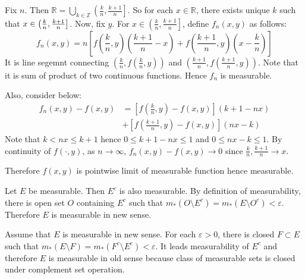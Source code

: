 \begin{problem}[1.23] \hfill

	Fix $n$. Then $\mathbb{R} = \bigcup_{k \in \mathbb{Z}} \left ( \frac{k}{n}, \frac{k+1}{n} \right ]$. So for each $x \in \mathbb{R}$, there exists unique $k$ such that $x \in \left ( {k \over n}, \frac{k+1}{n} \right ]$. Now, fix $y$. For $x \in \left ( \frac{k}{n}, \frac{k+1}{n} \right ]$, define $f_n(x, y)$ as follows:
	\begin{equation*}
		f_n(x, y) = n \left[ f\left( \frac{k}{n}, y \right)\left( \frac{k+1}{n}-x \right) + f\left( \frac{k+1}{n}, y \right)\left( x-\frac{k}{n} \right) \right]
		\label{<+label+>}
	\end{equation*}
	It is line segemnt connecting $\left( \frac{k}{n}, f\left( \frac{k}{n}, y \right) \right)$ and $\left( \frac{k+1}{n}, f\left( \frac{k+1}{n}, y \right) \right)$.
	Note that it is sum of product of two continuous functions. Hence $f_n$ is measurable. 

	Also, consider below:
	\begin{equation*}
		\begin{split}
			f_n(x, y) - f(x, y)
			& = \left[ f\left( \frac{k}{n}, y \right) - f(x, y) \right]\left( k+1 -nx \right) \\
			& + \left[ f\left( \frac{k+1}{n}, y \right) - f(x, y) \right]\left( nx -k \right)
		\end{split}
		\label{<+label+>}
	\end{equation*}
	Note that $k < nx \leq k+1$ hence $0\leq k+1 -nx \leq 1$ and $0 \leq nx -k \leq 1$. 
	By continuity of $f(\cdot, y)$, as $n \rightarrow \infty$, $f_n(x, y) - f(x, y) \rightarrow 0$ since $\frac{k}{n}, \frac{k+1}{n} \rightarrow x$. 

	Therefore $f(x, y)$ is pointwise limit of measurable function hence measurable.
\end{problem}

\begin{problem}[1.25] \hfill

	Let $E$ be measurable. Then $E^c$ is also measurable. By definition of measurability, there is open set $O$ containing $E^c$ such that $m_*(O \setminus E^c) = m_* (E \setminus O^c) < \varepsilon$. Therefore $E$ is measurable in new sense.

	Assume that $E$ is measurable in new sense. For each $\varepsilon>0$, there is closed $F \subset E$ such that $m_*(E \setminus F) = m_*(F^c \setminus E^c) < \varepsilon$. It leads measurability of $E^c$ and therefore $E$ is measurable in old sense because class of measurable sets is closed under complement set operation.
	
\end{problem}

